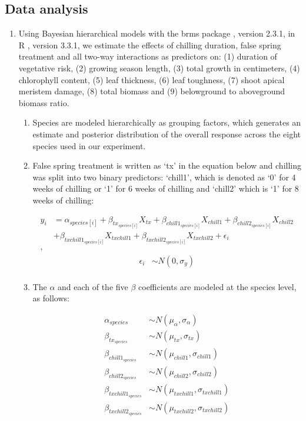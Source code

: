 \documentclass{article}\usepackage[]{graphicx}\usepackage[]{color}
\begin{document}
\subsection*{Data analysis}
\begin{enumerate}
\item Using Bayesian hierarchical models with the brms package \citep{brms}, version 2.3.1,  in R \citep{R}, version 3.3.1, we estimate the effects of chilling duration, false spring treatment and all two-way interactions as predictors on: (1) duration of vegetative risk, (2) growing season length, (3) total growth in centimeters, (4) chlorophyll content, (5) leaf thickness, (6) leaf toughness, (7) shoot apical meristem damage, (8) total biomass and (9) belowground to aboveground biomass ratio. 
  \begin{enumerate}
  \item Species are modeled hierarchically as grouping factors, which generates an estimate and posterior distribution of the overall response across the eight species used in our experiment.
  \item False spring treatment is written as `tx' in the equation below and chilling was split into two binary predictors: `chill1', which is denoted as `0' for 4 weeks of chilling or `1' for 6 weeks of chilling and `chill2' which is `1' for 8 weeks of chilling:

\begin{align*}
y_i &= \alpha_{species[i]} + \beta_{tx_{species[i]}}X_{tx} + \beta_{chill1_{species[i]}}X_{chill1} + \beta_{chill2_{species[i]}}X_{chill2}\\
&+ \beta_{txchill1_{species[i]}}X_{txchill1} + \beta_{txchill2_{species[i]}}X_{txchill2} + \epsilon_i\\,
\end{align*}
\begin{align*}
\epsilon_i & \sim N(0,\sigma_y) \\
\end{align*}

\item The $\alpha$ and each of the five $\beta$ coefficients are modeled at the species level, as follows:

\begin{align*}
\alpha_{species} & \sim N(\mu_{\alpha}, \sigma_{\alpha}) \\
\beta_{tx_{species}} & \sim N(\mu_{tx}, \sigma_{tx}) \\
\beta_{chill1_{species}} & \sim N(\mu_{chill1}, \sigma_{chill1}) \\
\beta_{chill2_{species}} & \sim N(\mu_{chill2}, \sigma_{chill2}) \\
\beta_{txchill1_{species}} & \sim N(\mu_{txchill1}, \sigma_{txchill1}) \\
\beta_{txchill2_{species}} & \sim N(\mu_{txchill2}, \sigma_{txchill2}) \\
\end{align*}


\end{enumerate}
\end{enumerate}
\end{document}
